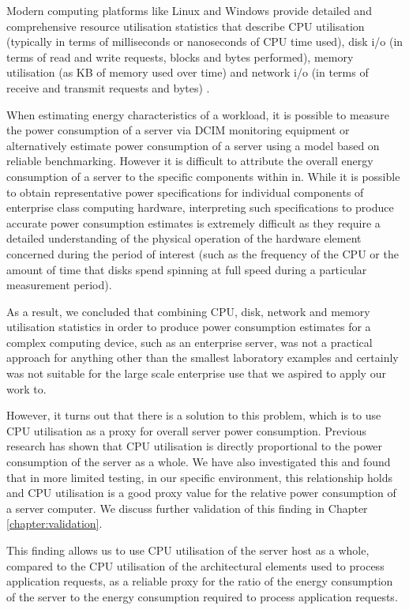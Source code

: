 Modern computing platforms like Linux and Windows provide detailed and comprehensive resource utilisation statistics that describe CPU utilisation (typically in terms of milliseconds or nanoseconds of CPU time used), disk i/o (in terms of read and write requests, blocks and bytes performed), memory utilisation (as KB of memory used over time) and network i/o (in terms of receive and transmit requests and bytes) \cite{unix_sar_command, windows_performance_monitor}.

When estimating energy characteristics of a workload, it is possible to measure the power consumption of a server via DCIM monitoring equipment or alternatively estimate power consumption of a server using a model based on reliable benchmarking.  However it is difficult to attribute the overall energy consumption of a server to the specific components within in.  While it is possible to obtain representative power specifications \cite{hitachi_drive_data_sheet} for individual components of enterprise class computing hardware, interpreting such specifications to produce accurate power consumption estimates is extremely difficult as they require a detailed understanding of the physical operation of the hardware element concerned during the period of interest (such as the frequency of the CPU or the amount of time that disks spend spinning at full speed during a particular measurement period).

As a result, we concluded that combining CPU, disk, network and memory utilisation statistics in order to produce power consumption estimates for a complex computing device, such as an enterprise server, was not a practical approach for anything other than the smallest laboratory examples and certainly was not suitable for the large scale enterprise use that we aspired to apply our work to.

However, it turns out that there is a solution to this problem, which is to use CPU utilisation as a proxy for overall server power consumption.  Previous research \cite{bashroush2018_hardwarerefresh} has shown that CPU utilisation is directly proportional to the power consumption of the server as a whole.  We have also investigated this and found that in more limited testing, in our specific environment, this relationship holds and CPU utilisation is a good proxy value for the relative power consumption of a server computer.  We discuss further validation of this finding in Chapter \ref{chapter:validation}.

This finding allows us to use CPU utilisation of the server host as a whole, compared to the CPU utilisation of the architectural elements used to process application requests, as a reliable proxy for the ratio of the energy consumption of the server to the energy consumption required to process application requests.

